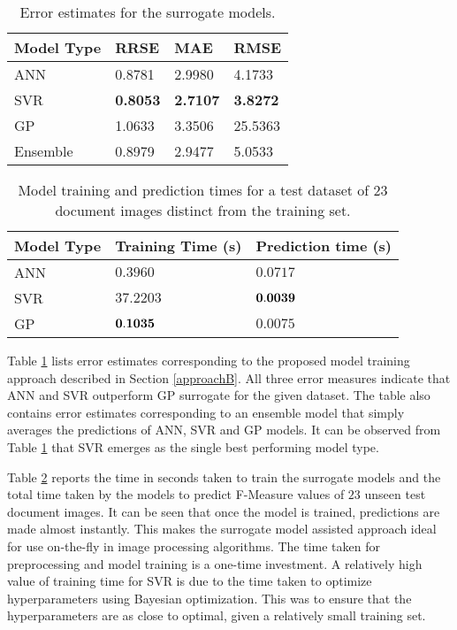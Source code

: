 \documentclass[10pt, a4paper, conference, compsocconf]{IEEEtran}
\begin{document}
\begin{table}[!t]
\centering
\caption{Error estimates for the surrogate models.\label{tab:resB}}
\begin{tabular}{p{1.5cm}p{1.5cm}p{1.5cm}p{1cm}}
\hline
Model Type & RRSE & MAE & RMSE \\ \hline
ANN & 0.8781 & 2.9980 & 4.1733 \\
SVR & {\bf 0.8053} & {\bf 2.7107} & {\bf 3.8272}\\
GP & 1.0633 & 3.3506 & 25.5363 \\
Ensemble & 0.8979 & 2.9477 & 5.0533 \\
\hline
\end{tabular}
\end{table}

\begin{table}[!t]
\centering
\caption{Model training and prediction times for a test dataset of $23$ document images distinct from the training set.\label{tab:times}}
\begin{tabular}{lll}
\hline
Model Type & Training Time (s) & Prediction time (s) \\ \hline
ANN & $0.3960$ & $0.0717$\\
SVR & $37.2203$ & ${\bf 0.0039}$\\
GP & ${\bf 0.1035}$ & $0.0075$\\
\hline
\end{tabular}
\end{table}

Table \ref{tab:resB} lists error estimates corresponding to the proposed model training approach described in Section \ref{approachB}. All three error measures indicate that ANN and SVR outperform GP surrogate for the given dataset. The table also contains error estimates corresponding to an ensemble model that simply averages the predictions of ANN, SVR and GP models. It can be observed from Table \ref{tab:resB} that SVR emerges as the single best performing model type.

Table \ref{tab:times} reports the time in seconds taken to train the surrogate models and the total time taken by the models to predict F-Measure values of $23$ unseen test document images. It can be seen that once the model is trained, predictions are made almost instantly. This makes the surrogate model assisted approach ideal for use on-the-fly in image processing algorithms. The time taken for preprocessing and model training is a one-time investment. A relatively high value of training time for SVR is due to the time taken to optimize hyperparameters using Bayesian optimization. This was to ensure that the hyperparameters are as close to optimal, given a relatively small training set. 
\end{document}
